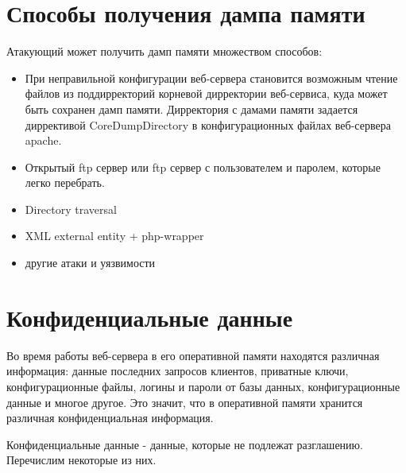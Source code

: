 \documentclass[20pt]{article}
\begin{document}
\newpage

\section{Способы получения дампа памяти}

Атакующий может получить дамп памяти множеством способов:
\begin{itemize}
  \item При неправильной конфигурации веб-сервера становится возможным чтение
  файлов из поддирректорий корневой дирректории веб-сервиса\cite{directory-listing},
  куда может быть сохранен дамп памяти. Дирректория с дамами памяти задается
  диррективой CoreDumpDirectory в конфигурационных файлах веб-сервера apache.
  \item Открытый ftp сервер или ftp сервер с пользователем и паролем, которые
  легко перебрать.
  \item Directory traversal\cite{directory-traversal}
  \item XML external entity\cite{xxe} + php-wrapper\cite{php-wrappers}
  \item другие атаки и уязвимости
\end{itemize}

\newpage

\section{Конфиденциальные данные}

Во время работы веб-сервера в его оперативной памяти находятся различная
информация: данные последних запросов клиентов, приватные ключи, конфигурационные
файлы, логины и пароли от базы данных, конфигурационные данные и многое другое.
Это значит, что в оперативной памяти хранится различная конфиденциальная информация.

Конфиденциальные данные - данные, которые не подлежат разглашению. Перечислим
некоторые из них.
\end{document}
